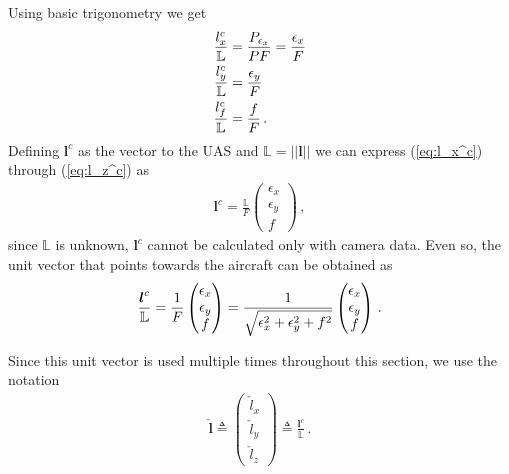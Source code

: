 Using basic trigonometry we get
\begin{align}
\frac{l_x^c}{\mathbb{L}}&=\frac{P_{\epsilon_x}}{PF}=\frac{\epsilon_x}{F}{\label{eq:l_x^c}}\\
\frac{l_y^c}{\mathbb{L}}&=\frac{\epsilon_y}{F}{\label{eq:l_y^c}} \\
\frac{l_f^c}{\mathbb{L}}&=\frac{f}{F}{\label{eq:l_z^c}}\,.
\end{align}
Defining $\boldsymbol{l}^c$ as the vector to the UAS and $\mathbb{L}=\lvert\lvert \boldsymbol{l}\rvert\rvert$ we can express (\ref{eq:l_x^c}) through (\ref{eq:l_z^c}) as
\begin{align}
\boldsymbol{l}^c=\frac{\mathbb{L}}{F}
\begin{pmatrix}
\epsilon_x \\
\epsilon_y \\
f
\end{pmatrix}\,,
\end{align}
since $\mathbb{L}$ is unknown, $\boldsymbol{l}^c$ cannot be calculated only with camera data. Even so, the unit vector that points towards the aircraft can be obtained as
\begin{align}{\label{eq:norm_line_of_sight_vector}}
\frac{\boldsymbol{l}^c}{\mathbb{L}}=\frac{1}{F}
\begin{pmatrix}
\epsilon_x \\
\epsilon_y \\
f
\end{pmatrix} =
\frac{1}{\sqrt{\epsilon_x^2+\epsilon_y^2+f^2}}
\begin{pmatrix}
\epsilon_x \\
\epsilon_y \\
f
\end{pmatrix}\,.
\end{align}

Since this unit vector is used multiple times throughout this section, we use the notation
\begin{align*}
\check{\boldsymbol{l}}\triangleq
\begin{pmatrix}
\check{l}_x \\
\check{l}_y \\
\check{l}_z
\end{pmatrix} \triangleq
\frac{\boldsymbol{l}^c}{\mathbb{L}}\,.
\end{align*}
\pagebreak
